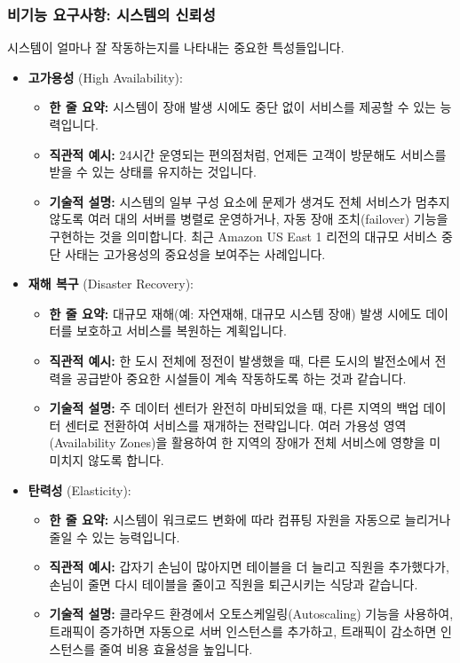 \documentclass[11pt,a4paper]{article}
\theoremstyle{definition}
\begin{document}
\subsubsection*{비기능 요구사항: 시스템의 신뢰성}
시스템이 얼마나 잘 작동하는지를 나타내는 중요한 특성들입니다.
\begin{itemize}
    \item \textbf{고가용성} (High Availability):
    \begin{itemize}
        \item \textbf{한 줄 요약:} 시스템이 장애 발생 시에도 중단 없이 서비스를 제공할 수 있는 능력입니다.
        \item \textbf{직관적 예시:} 24시간 운영되는 편의점처럼, 언제든 고객이 방문해도 서비스를 받을 수 있는 상태를 유지하는 것입니다.
        \item \textbf{기술적 설명:} 시스템의 일부 구성 요소에 문제가 생겨도 전체 서비스가 멈추지 않도록 여러 대의 서버를 병렬로 운영하거나, 자동 장애 조치(failover) 기능을 구현하는 것을 의미합니다. 최근 Amazon US East 1 리전의 대규모 서비스 중단 사태는 고가용성의 중요성을 보여주는 사례입니다.
    \end{itemize}
    \item \textbf{재해 복구} (Disaster Recovery):
    \begin{itemize}
        \item \textbf{한 줄 요약:} 대규모 재해(예: 자연재해, 대규모 시스템 장애) 발생 시에도 데이터를 보호하고 서비스를 복원하는 계획입니다.
        \item \textbf{직관적 예시:} 한 도시 전체에 정전이 발생했을 때, 다른 도시의 발전소에서 전력을 공급받아 중요한 시설들이 계속 작동하도록 하는 것과 같습니다.
        \item \textbf{기술적 설명:} 주 데이터 센터가 완전히 마비되었을 때, 다른 지역의 백업 데이터 센터로 전환하여 서비스를 재개하는 전략입니다. 여러 가용성 영역(Availability Zones)을 활용하여 한 지역의 장애가 전체 서비스에 영향을 미 미치지 않도록 합니다.
    \end{itemize}
    \item \textbf{탄력성} (Elasticity):
    \begin{itemize}
        \item \textbf{한 줄 요약:} 시스템이 워크로드 변화에 따라 컴퓨팅 자원을 자동으로 늘리거나 줄일 수 있는 능력입니다.
        \item \textbf{직관적 예시:} 갑자기 손님이 많아지면 테이블을 더 늘리고 직원을 추가했다가, 손님이 줄면 다시 테이블을 줄이고 직원을 퇴근시키는 식당과 같습니다.
        \item \textbf{기술적 설명:} 클라우드 환경에서 오토스케일링(Autoscaling) 기능을 사용하여, 트래픽이 증가하면 자동으로 서버 인스턴스를 추가하고, 트래픽이 감소하면 인스턴스를 줄여 비용 효율성을 높입니다.
    \end{itemize}
\end{itemize}
\end{document}
